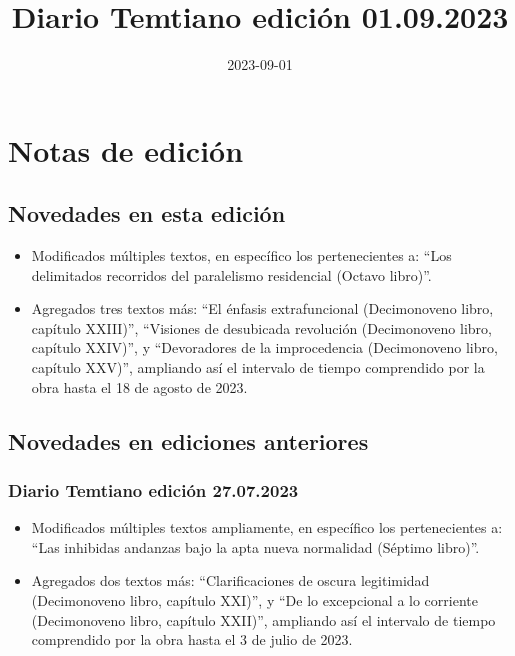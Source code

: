 \documentclass[
]{book}
\title{Diario Temtiano edición 01.09.2023}
\author{}
\date{\vspace{-2.5em}2023-09-01}
\begin{document}
\maketitle

{
\setcounter{tocdepth}{1}
\tableofcontents
}
\hypertarget{notas-de-ediciuxf3n}{%
\chapter*{Notas de edición}\label{notas-de-ediciuxf3n}}

\hypertarget{novedades-en-esta-ediciuxf3n}{%
\section*{Novedades en esta edición}\label{novedades-en-esta-ediciuxf3n}}

\begin{itemize}
\item
  Modificados múltiples textos, en específico los pertenecientes a: ``Los delimitados recorridos del paralelismo residencial (Octavo libro)''.
\item
  Agregados tres textos más: ``El énfasis extrafuncional (Decimonoveno libro, capítulo XXIII)'', ``Visiones de desubicada revolución (Decimonoveno libro, capítulo XXIV)'', y ``Devoradores de la improcedencia (Decimonoveno libro, capítulo XXV)'', ampliando así el intervalo de tiempo comprendido por la obra hasta el 18 de agosto de 2023.
\end{itemize}

\hypertarget{novedades-en-ediciones-anteriores}{%
\section*{Novedades en ediciones anteriores}\label{novedades-en-ediciones-anteriores}}

\hypertarget{diario-temtiano-ediciuxf3n-27.07.2023}{%
\subsection*{Diario Temtiano edición 27.07.2023}\label{diario-temtiano-ediciuxf3n-27.07.2023}}

\begin{itemize}
\item
  Modificados múltiples textos ampliamente, en específico los pertenecientes a: ``Las inhibidas andanzas bajo la apta nueva normalidad (Séptimo libro)''.
\item
  Agregados dos textos más: ``Clarificaciones de oscura legitimidad (Decimonoveno libro, capítulo XXI)'', y ``De lo excepcional a lo corriente (Decimonoveno libro, capítulo XXII)'', ampliando así el intervalo de tiempo comprendido por la obra hasta el 3 de julio de 2023.
\end{itemize}
\end{document}
